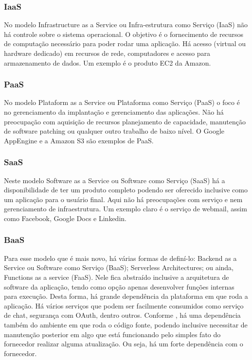

\subsubsection{IaaS}\label{iaas}

No modelo Infrastructure as a Service ou Infra-estrutura como Serviço (IaaS)
não há controle sobre o sistema operacional. O objetivo é o fornecimento
de recursos de computação necessário para poder rodar uma aplicação. Há acesso (virtual
ou hardware dedicado) em recursos de rede, computadores e acesso para armazenamento
de dados.
Um exemplo é o produto EC2 da Amazon.


\subsubsection{PaaS}\label{paas}

No modelo Plataform as a Service ou Plataforma como Serviço (PaaS)
o foco é no gerenciamento da implantação e gerenciamento das aplicações.
Não há preocupação com aquisição de recursos planejamento de capacidade, manutenção de
software patching ou qualquer outro trabalho de baixo nível. O Google AppEngine e a
Amazon S3 são exemplos de PaaS.

\subsubsection{SaaS}\label{saas}

Neste modelo Software as a Service ou Software como Serviço (SaaS)
há a disponibilidade de ter um produto completo podendo ser oferecido
inclusive como um aplicação para o usuário final. Aqui não há preocupações com serviço
e nem gerenciamento de infraestrutura. Um exemplo claro é o serviço de webmail, assim
como Facebook, Google Docs e Linkedin.

\subsubsection{BaaS}\label{baas}

Para esse modelo que é mais novo, há várias formas de definí-lo:
Backend as a Service ou Software como Serviço (BaaS); Serverless Architectures; ou ainda,
Functions as a service (FaaS).
Nele fica abstraído inclusive a arquitetura de software da aplicação,
tendo como opção apenas desenvolver funções internas para execução. Desta forma, há grande
dependência da plataforma em que roda a aplicação.
Há vários serviços que podem ser facilmente consumidos como serviço de chat, segurança com
OAuth, dentro outros.
Conforme \cite{martin-serverless}, há uma dependência também do ambiente em que roda o
código fonte, podendo inclusive necessitar de manutenção posterior em algo que está
funcionando pelo simples fato do fornecedor realizar alguma atualização.
Ou seja, há um forte dependência com o fornecedor.


